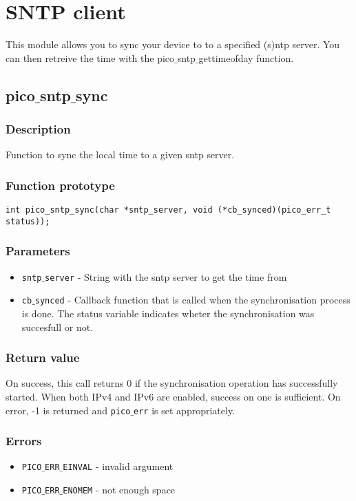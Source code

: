 \section{SNTP client}

This module allows you to sync your device to to a specified (s)ntp server.
You can then retreive the time with the pico$\_$sntp$\_$gettimeofday function.


\subsection{pico$\_$sntp$\_$sync}

\subsubsection*{Description}
Function to sync the local time to a given sntp server.
\subsubsection*{Function prototype}
\begin{verbatim}
int pico_sntp_sync(char *sntp_server, void (*cb_synced)(pico_err_t status));
\end{verbatim}

\subsubsection*{Parameters}
\begin{itemize}[noitemsep]
\item \texttt{sntp$\_$server} - String with the sntp server to get the time from
\item \texttt{cb$\_$synced} - Callback function that is called when the synchronisation process is done. The status variable indicates wheter the synchronisation was succesfull or not.
\end{itemize}

\subsubsection*{Return value}
On success, this call returns 0 if the synchronisation operation has successfully started. When both IPv4 and IPv6 are enabled, success on one is sufficient.
On error, -1 is returned and \texttt{pico$\_$err} is set appropriately.

\subsubsection*{Errors}
\begin{itemize}[noitemsep]
\item \texttt{PICO$\_$ERR$\_$EINVAL} - invalid argument
\item \texttt{PICO$\_$ERR$\_$ENOMEM} - not enough space
\end{itemize}

